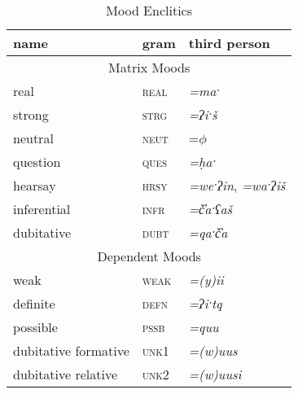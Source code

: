 \begin{table}[ht]
\centering
\caption{Mood Enclitics}
\label{table:moods}
\begin{tabular}{lll}
name                                       & gram                         & third person                           \\ \hline
\multicolumn{3}{|c|}{Matrix Moods}       \\ \hline
\multicolumn{1}{|l|}{real}               & \multicolumn{1}{l|}{\textsc{real}} & \multicolumn{1}{l|}{\textit{=maˑ}}             \\ \hline
\multicolumn{1}{|l|}{strong}                 & \multicolumn{1}{l|}{\textsc{strg}} & \multicolumn{1}{l|}{\textit{=ʔiˑš}}            \\ \hline
\multicolumn{1}{|l|}{neutral}              & \multicolumn{1}{l|}{\textsc{neut}} & \multicolumn{1}{l|}{=$\phi$\footnotemark}       \\ \hline
\multicolumn{1}{|l|}{question}             & \multicolumn{1}{l|}{\textsc{ques}} & \multicolumn{1}{l|}{\textit{=ḥaˑ}}             \\ \hline
\multicolumn{1}{|l|}{hearsay}              & \multicolumn{1}{l|}{\textsc{hrsy}} & \multicolumn{1}{l|}{\textit{=weˑʔin}, \textit{=waˑʔiš}} \\ \hline
\multicolumn{1}{|l|}{inferential}        & \multicolumn{1}{l|}{\textsc{infr}} & \multicolumn{1}{l|}{\textit{=č̓aˑʕaš}}        \\ \hline
\multicolumn{1}{|l|}{dubitative}           & \multicolumn{1}{l|}{\textsc{dubt}} & \multicolumn{1}{l|}{\textit{=qaˑč̓a}}          \\ \hline
\multicolumn{3}{|c|}{Dependent Moods} \\ \hline
\multicolumn{1}{|l|}{weak}                 & \multicolumn{1}{l|}{\textsc{weak}} & \multicolumn{1}{l|}{\textit{=(y)ii}}            \\ \hline
\multicolumn{1}{|l|}{definite}             & \multicolumn{1}{l|}{\textsc{defn}} & \multicolumn{1}{l|}{\textit{=ʔiˑtq}}            \\ \hline
\multicolumn{1}{|l|}{possible}             & \multicolumn{1}{l|}{\textsc{pssb}} & \multicolumn{1}{l|}{\textit{=quu}}              \\ \hline
\multicolumn{1}{|l|}{dubitative formative} & \multicolumn{1}{l|}{\textsc{unk1}} & \multicolumn{1}{l|}{\textit{=(w)uus}}           \\ \hline
\multicolumn{1}{|l|}{dubitative relative}  & \multicolumn{1}{l|}{\textsc{unk2}} & \multicolumn{1}{l|}{\textit{=(w)uusi}}          \\ \hline

\end{tabular}
\end{table}
